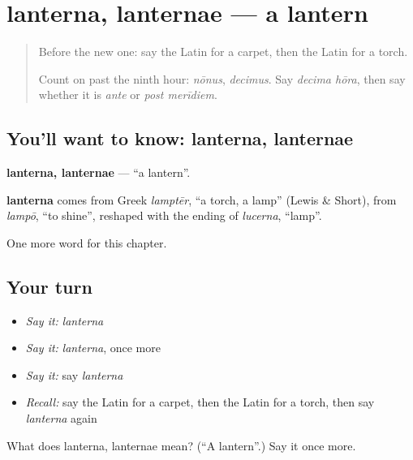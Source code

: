 \section[lanterna, lanternae]{lanterna, lanternae — a lantern}

\label{lesson:LA-C139-lanterna}



\begin{quote}
Before the new one: say the Latin for a carpet, then the Latin for a torch.

Count on past the ninth hour: \emph{nōnus}, \emph{decimus}. Say \emph{decima hōra}, then say whether it is \emph{ante} or \emph{post merīdiem}.
\end{quote}

\subsection*{You'll want to know: lanterna, lanternae}
\textbf{lanterna, lanternae} — \textquotedblleft{}a lantern\textquotedblright{}.

\begin{cousinweb}
\textbf{lanterna} comes from Greek \emph{lamptēr}, \textquotedblleft{}a torch, a lamp\textquotedblright{} (Lewis \& Short), from \emph{lampō}, \textquotedblleft{}to shine\textquotedblright{}, reshaped with the ending of \emph{lucerna}, \textquotedblleft{}lamp\textquotedblright{}.
\end{cousinweb}

\begin{grammarlens}[title={What you've built}]
One more word for this chapter.
\end{grammarlens}

\subsection*{Your turn}
\begin{itemize}
\raggedright
  \item \emph{Say it:} \emph{lanterna}
  \item \emph{Say it:} \emph{lanterna}, once more
  \item \emph{Say it:} say \emph{lanterna}
  \item \emph{Recall:} say the Latin for a carpet, then the Latin for a torch, then say \emph{lanterna} again
\end{itemize}

\begin{tcolorbox}[breakable,colback=teal!4,colframe=teal!35!black,title={Before you move on}]
What does lanterna, lanternae mean? (\textquotedblleft{}A lantern\textquotedblright{}.) Say it once more.
\end{tcolorbox}
